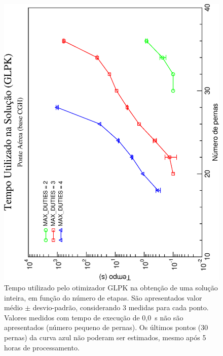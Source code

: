 \documentclass[12pt,a4paper]{article}
\begin{document}
\begin{figure}[htb]
	\begin{center}
		\includegraphics[scale=0.45,angle=-90]{fig/glpk_solution_time.eps}
		\caption{Tempo utilizado pelo otimizador GLPK na obtenção de uma solução inteira, em função do 
		número de etapas. São apresentados valor médio $\pm$ desvio-padrão, considerando 3 medidas para 
		cada ponto. Valores medidos com tempo de execução de 0,0~s não são apresentados (número pequeno 
		de pernas). Os últimos pontos (30 pernas) da curva azul não poderam ser estimados, mesmo após 
		5 horas de processamento.}
		\label{fig:glpk}
	\end{center}
\end{figure}
\end{document}
